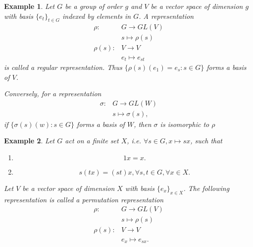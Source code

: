 \documentclass[12pt]{article}
\newtheorem{example}{Example}
\begin{document}
\begin{example}
Let $G$ be a group of order $g$ and $V$ be a vector space of dimension $g$ with basis $\{e_t\}_{t\in G}$ indexed by elements in $G$. A representation 
\begin{align*}
\rho:&G\to GL(V)\\
&s\mapsto\rho(s)\\
\rho(s):&V\to V\\
&e_t\mapsto e_{st}
\end{align*}
is called a regular representation. Thus $\{\rho(s)(e_1)=e_s:s\in G\}$ forms a basis of $V$.

Conversely, for a representation 
\begin{align*}
\sigma:&G\to GL(W)\\
&s\mapsto\sigma(s),
\end{align*}
if $\{\sigma(s)(w):s\in G\}$ forms a basis of $W$, then $\sigma$ is isomorphic to $\rho$
\end{example}

\begin{example}
Let $G$ act on a finite set $X$, i.e. $\forall s\in G,x\mapsto sx$, such that 
\begin{enumerate}
	\item \[1x=x.\]
	\item \[s(tx)=(st)x,\forall s,t\in G,\forall x\in X.\]
\end{enumerate}
Let $V$ be a vector space of dimension $X$ with basis $\{e_x\}_{x\in X}$. The following representation is called a permutation representation
\begin{align*}
\rho:&G\to GL(V)\\
&s\mapsto\rho(s)\\
\rho(s):&V\to V\\
&e_x\mapsto e_{sx}.
\end{align*}
\end{example}




\end{document}
